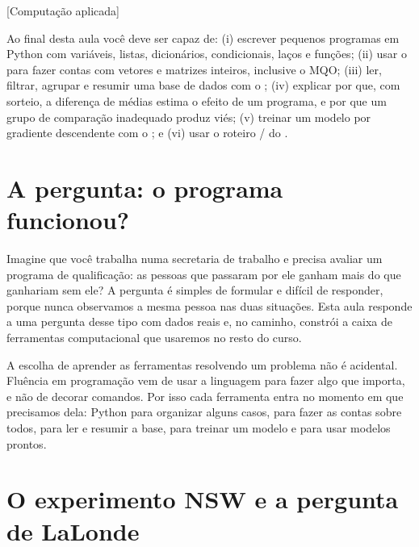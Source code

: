 [Computação aplicada]

\begin{intuicao}[title={Objetivos da aula}]
Ao final desta aula você deve ser capaz de: (i) escrever pequenos programas em
Python com variáveis, listas, dicionários, condicionais, laços e funções;
(ii) usar o  para fazer contas com vetores e matrizes inteiros,
inclusive o MQO; (iii) ler, filtrar, agrupar e resumir uma base de dados com o
; (iv) explicar por que, com sorteio, a diferença de médias estima
o efeito de um programa, e por que um grupo de comparação inadequado produz
viés; (v) treinar um modelo por gradiente descendente com o ; e
(vi) usar o roteiro / do .
\end{intuicao}

\section{A pergunta: o programa funcionou?}

Imagine que você trabalha numa secretaria de trabalho e precisa avaliar um
programa de qualificação: as pessoas que passaram por ele ganham mais do que
ganhariam sem ele? A pergunta é simples de formular e difícil de responder,
porque nunca observamos a mesma pessoa nas duas situações. Esta aula responde a
uma pergunta desse tipo com dados reais e, no caminho, constrói a caixa de
ferramentas computacional que usaremos no resto do curso.

A escolha de aprender as ferramentas resolvendo um problema não é acidental.
Fluência em programação vem de usar a linguagem para fazer algo que importa, e
não de decorar comandos. Por isso cada ferramenta entra no momento em que
precisamos dela: Python para organizar alguns casos,  para fazer as
contas sobre todos,  para ler e resumir a base,  para
treinar um modelo e  para usar modelos prontos.

\section{O experimento NSW e a pergunta de LaLonde}

